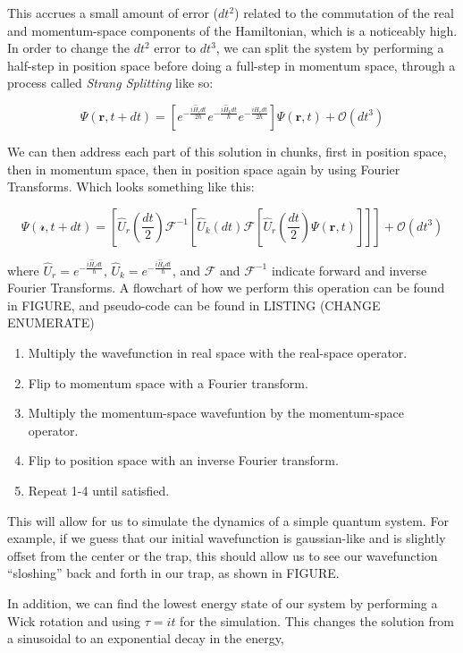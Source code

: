 This accrues a small amount of error ($dt^2$) related to the commutation of the real and momentum-space components of the Hamiltonian, which is a noticeably high.
In order to change the $dt^2$ error to $dt^3$, we can split the system by performing a half-step in position space before doing a full-step in momentum space, through a process called \textit{Strang Splitting} like so:

$$
\Psi(\mathbf{r},t+dt) = \left[e^{-\frac{i\hat{H}_rdt}{2\hbar}}e^{-\frac{i\hat{H}_kdt}{\hbar}}e^{-\frac{i\hat{H}_rdt}{2\hbar}} \right]\Psi(\mathbf{r},t) + \mathcal{O}(dt^3)
$$

We can then address each part of this solution in chunks, first in position space, then in momentum space, then in position space again by using Fourier Transforms.
Which looks something like this:

$$
\Psi(\mathcal{r}, t+dt) = \left[\hat{U}_r\left(\frac{dt}{2}\right)\mathcal{F}^{-1}\left[\hat{U}_k(dt) \mathcal{F} \left[\hat{U}_r\left(\frac{dt}{2}\right) \Psi(\mathbf{r},t) \right] \right] \right] + \mathcal{O}(dt^3)
$$

where $\hat{U}_r = e^{-\frac{i\hat{H}_rdt}{\hbar}}$, $\hat{U}_k = e^{-\frac{i\hat{H}_kdt}{\hbar}}$, and $\mathcal{F}$ and $\mathcal{F}^{-1}$ indicate forward and inverse Fourier Transforms.
A flowchart of how we perform this operation can be found in FIGURE, and pseudo-code can be found in LISTING (CHANGE ENUMERATE)

\begin{enumerate}
\item Multiply the wavefunction in real space with the real-space operator.
\item Flip to momentum space with a Fourier transform.
\item Multiply the momentum-space wavefuntion by the momentum-space operator.
\item Flip to position space with an inverse Fourier transform.
\item Repeat 1-4 until satisfied.
\end{enumerate}

This will allow for us to simulate the dynamics of a simple quantum system.
For example, if we guess that our initial wavefunction is gaussian-like and is slightly offset from the center or the trap, this should allow us to see our wavefunction ``sloshing'' back and forth in our trap, as shown in FIGURE.

In addition, we can find the lowest energy state of our system by performing a Wick rotation and using $\tau = it$ for the simulation.
This changes the solution from a sinusoidal to an exponential decay in the energy,

